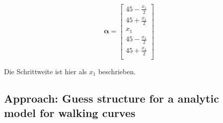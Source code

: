 \documentclass[10pt,a4paper]{article}
\begin{document}
\begin{itemize}
\begin{equation}
\bm{\alpha} = \begin{bmatrix}
45 - \frac{x_1}{2} \\
45 + \frac{x_1}{2} \\
x_1 \\
45 - \frac{x_1}{2}  \\
45 + \frac{x_1}{2} \\
\end{bmatrix}
\end{equation}

Die Schrittweite ist hier als $x_1$ beschrieben.

\end{itemize}




\subsection{Approach: Guess structure for a analytic model for walking curves}
\end{document}
